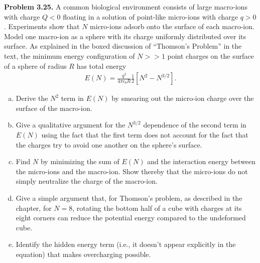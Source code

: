 \documentclass{article}
\begin{document}
\hrulefill

\textbf{Problem 3.25.} A common biological environment consists of large macro-ions with charge $Q < 0$ floating in a solution of point-like micro-ions with charge $q > 0$. Experiments show that $N$ micro-ions adsorb onto the surface of each macro-ion. Model one macro-ion as a sphere with its charge uniformly distributed over its surface. As explained in the boxed discussion of “Thomson’s Problem” in the text, the minimum energy configuration of $N >\!\! > 1$ point charges on the surface of a sphere of radius $R$ has total energy
\begin{equation*}
\begin{aligned}
	E(N) = \frac{q^2}{4\pi\epsilon _0 R}\frac{1}{2}\left[N^2 - N^{3/2}\right].
\end{aligned}
\end{equation*}

\begin{enumerate}[(a)]
\item Derive the $N^2$ term in $E(N)$ by smearing out the micro-ion charge over the surface of the macro-ion.
\item Give a qualitative argument for the $N^{3/2}$ dependence of the second term in $E(N)$ using the fact that the first term does not account for the fact that the charges try to avoid one another on the sphere’s surface.
\item Find $N$ by minimizing the sum of $E(N)$ and the interaction energy between the micro-ions and the macro-ion. Show thereby that the micro-ions do not simply neutralize the charge of the macro-ion.
\item Give a simple argument that, for Thomson's problem, as described in the chapter, for $N=8$, rotating the bottom half of a cube with charges at its eight corners can reduce the potential energy compared to the undeformed cube.
\item Identify the hidden energy term (i.e., it doesn't appear explicitly in the equation) that makes overcharging possible.
\end{enumerate}
\end{document}
